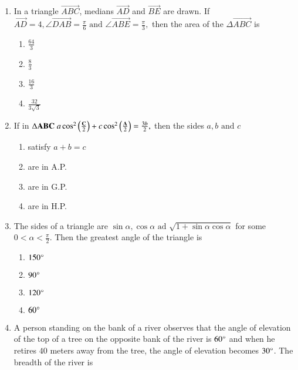 \documentclass[journal]{IEEEtran}
\theoremstyle{remark}
\begin{document}
\begin{enumerate}
\item In a triangle $\vec{ABC}$, medians $\vec{AD}$ and $\vec{BE}$ are drawn. If $\vec{AD}=4,\angle{\vec{DAB}}=\frac{\pi}{6} \text{ and } \angle{\vec{ABE}}=\frac{\pi}{3},$ then the area of the $\Delta{\vec{ABC}}$ is \hfill{}
\begin{multicols}{4}
\begin{enumerate}
        \item $\frac{64}{3}$                    
        \item $\frac{8}{3}$ 
        \item $\frac{16}{3}$ 
        \item $\frac{32}{3\sqrt{3}}$
\end{enumerate}
\end{multicols} 

\item If in $\Delta{\mathbf{ABC}}\;a\cos^2\left(\frac{\mathbf{C}}{2}\right) + c\cos^2\left(\frac{\mathbf{A}}{2}\right) = \frac{3b}{2},$ then the sides $a,b\text{ and }c$ \hfill{}
\begin{multicols}{4}
\begin{enumerate}
        \item satisfy $a+b=c$                    
        \item are in A.P. 
        \item are in G.P. 
        \item are in H.P.
\end{enumerate}
\end{multicols} 

\item The sides of a triangle are $\sin\alpha,\cos\alpha \text{ ad } \sqrt{1+\sin\alpha\cos\alpha}$ for some $0<\alpha<\frac{\pi}{2}.$ Then the greatest angle of the triangle is \hfill{}
\begin{multicols}{4}
\begin{enumerate}
        \item $150\degree$                    
        \item $90\degree$ 
        \item $120\degree$
        \item $60\degree$
\end{enumerate}
\end{multicols} 

\item A person standing on the bank of a river observes that the angle of elevation of the top of a tree on the opposite bank of the river is $60\degree$ and when he retires $40$ meters away from the tree, the angle of elevation becomes $30\degree$. The breadth of the river is 


\end{enumerate}
\end{document}
